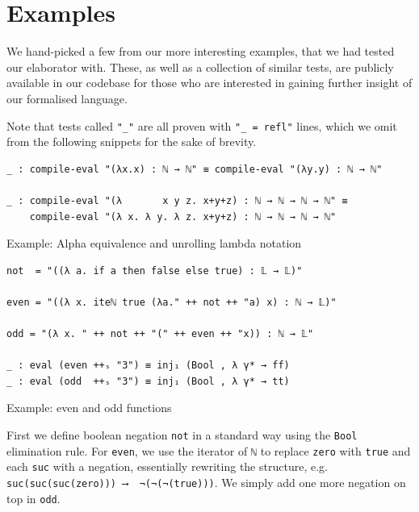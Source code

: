 \section{Examples} \label{sec:examples}

We hand-picked a few from our more interesting examples, that we had tested our elaborator with. These, as well as a collection of similar tests, are publicly available in our codebase for those who are interested in gaining further insight of our formalised language.

Note that tests called \verb$"_"$ are all proven with \verb$"_ = refl"$ lines, which we omit from the following snippets for the sake of brevity.

\begin{listing}[H]
\begin{verbatim}
_ : compile-eval "(λx.x) : ℕ → ℕ" ≡ compile-eval "(λy.y) : ℕ → ℕ"

_ : compile-eval "(λ       x y z. x+y+z) : ℕ → ℕ → ℕ → ℕ" ≡
    compile-eval "(λ x. λ y. λ z. x+y+z) : ℕ → ℕ → ℕ → ℕ"
\end{verbatim}
\caption{Example: Alpha equivalence and unrolling lambda notation}
\label{code:examples-generic}
\end{listing}

\begin{listing}[H]
\begin{verbatim}
not  = "((λ a. if a then false else true) : 𝕃 → 𝕃)" 

even = "((λ x. iteℕ true (λa." ++ not ++ "a) x) : ℕ → 𝕃)"

odd = "(λ x. " ++ not ++ "(" ++ even ++ "x)) : ℕ → 𝕃"

_ : eval (even ++ₛ "3") ≡ inj₁ (Bool , λ γ* → ff)
_ : eval (odd  ++ₛ "3") ≡ inj₁ (Bool , λ γ* → tt)
\end{verbatim}
\caption{Example: even and odd functions}
\label{code:examples-evenodd}
\end{listing}

First we define boolean negation \verb$not$ in a standard way using the \verb$Bool$ elimination rule. For \verb$even$, we use the iterator of \verb$ℕ$ to replace \verb$zero$ with \verb$true$ and each \verb$suc$ with a negation, essentially rewriting the structure, e.g. \verb$suc(suc(suc(zero))) ⟶  ¬(¬(¬(true)))$. We simply add one more negation on top in \verb$odd$.

